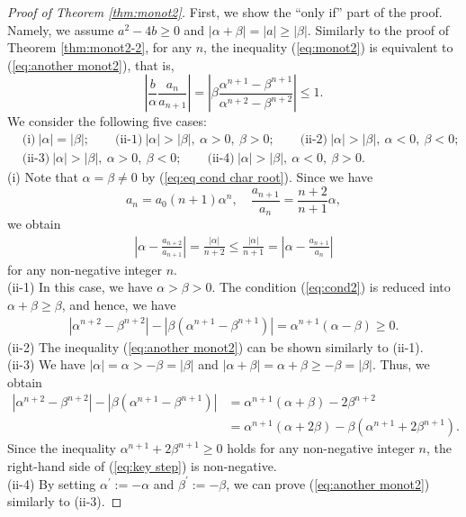 \documentclass[a4paper,11pt,reqno]{amsart}
\theoremstyle{plain}
\theoremstyle{definition}
\begin{document}
\begin{proof}[Proof of Theorem \ref{thm:monot2}]
First, we show the ``only if'' part of the proof. 
Namely, we assume $a^{2}-4b \geq 0$ and $|\alpha +\beta |=|a|\geq |\beta |$. 
Similarly to the proof of Theorem \ref{thm:monot2-2}, for any $n$, 
the inequality (\ref{eq:monot2}) is equivalent to (\ref{eq:another monot2}), that is, 
$$
\left|\frac{b}{\alpha }\frac{a_{n}}{a_{n+1}}\right|
   =
   \left|\beta \frac{\alpha ^{n+1}-\beta ^{n+1}}{\alpha ^{n+2}-\beta ^{n+2}}\right|\leq 1 .
$$
We consider the following five cases: 
\begin{align*}
&\textrm{(i)}\ |\alpha |=|\beta |; \qquad 
\textrm{(ii-1)}\ |\alpha |>|\beta |,\ \alpha >0,\ \beta > 0 ;\qquad 
\textrm{(ii-2)}\ |\alpha |>|\beta |,\ \alpha <0,\ \beta < 0 ;\\
&\textrm{(ii-3)}\ |\alpha |>|\beta |,\ \alpha >0,\ \beta < 0 ;\qquad 
\textrm{(ii-4)}\ |\alpha |>|\beta |,\ \alpha <0,\ \beta > 0 .
\end{align*}
(i)
Note that $\alpha =\beta \not=0$ by (\ref{eq:eq cond char root}). 
Since we have 
$$
a_{n}=a_{0}(n+1)\alpha ^{n}, \quad \frac{a_{n+1}}{a_{n}}=\frac{n+2}{n+1}\alpha , 
$$
we obtain 
\begin{align*}
\left|\alpha -\frac{a_{n+2}}{a_{n+1}}\right|
   =
   \frac{|\alpha |}{n+2}
   \leq 
   \frac{|\alpha |}{n+1}
   =
   \left|\alpha -\frac{a_{n+1}}{a_{n}}\right|
\end{align*}
for any non-negative integer $n$. 
\\
(ii-1)
In this case, we have $\alpha > \beta  >0$. 
The condition (\ref{eq:cond2}) is reduced into $\alpha +\beta \geq \beta $, and hence, we have 
\begin{align*}
|\alpha ^{n+2}-\beta ^{n+2}|-|\beta (\alpha ^{n+1}-\beta ^{n+1})|
   =
   \alpha ^{n+1}(\alpha -\beta )\geq 0.
\end{align*}
(ii-2)
The inequality 
(\ref{eq:another monot2})
can be shown similarly to (ii-1). 
\\
(ii-3)
We have $|\alpha |=\alpha >-\beta =|\beta |$ and $|\alpha +\beta |=\alpha +\beta \geq -\beta =|\beta |$. 
Thus, we obtain 
\begin{align}
|\alpha ^{n+2}-\beta ^{n+2}|-|\beta (\alpha ^{n+1}-\beta ^{n+1})|
   &=
   \alpha ^{n+1}(\alpha +\beta )-2\beta ^{n+2} \nonumber \\
\label{eq:key step}
   &=
   \alpha ^{n+1}(\alpha +2\beta )-\beta (\alpha ^{n+1}+2\beta ^{n+1}).
\end{align}
Since the inequality $\alpha ^{n+1}+2\beta ^{n+1}\geq 0$ holds for any non-negative integer $n$, 
the right-hand side of (\ref{eq:key step}) is non-negative. 
\\
(ii-4)
By setting $\alpha ^{\prime}:=-\alpha $ and $\beta ^{\prime}:=-\beta $, 
we can prove (\ref{eq:another monot2}) similarly to (ii-3). 


\end{proof}
\end{document}
